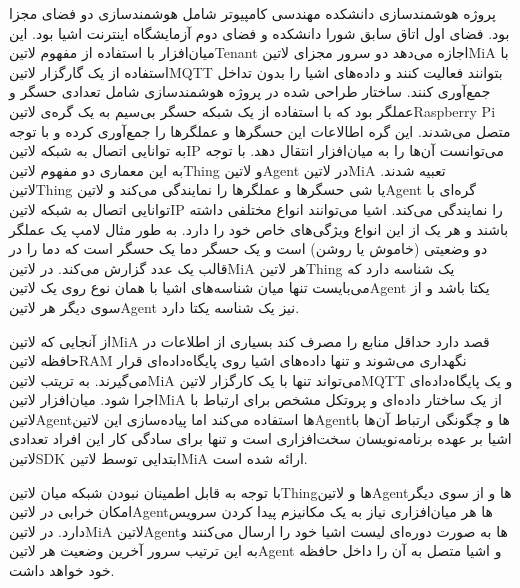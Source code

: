 \documentclass[]{assignment}
\begin{document}
پروژه هوشمند‌سازی دانشکده مهندسی کامپیوتر شامل هوشمند‌سازی دو فضای مجزا بود. فضای اول اتاق سابق شورا دانشکده و فضای دوم آزمایشگاه اینترنت اشیا بود.
این میان‌افزار با استفاده از مفهوم ‌لاتین{Tenant} اجازه می‌دهد دو سرور مجزای ‌لاتین{MiA} با استفاده از یک گارگزار ‌لاتین{MQTT}
بتوانند فعالیت کنند و داده‌های اشیا را بدون تداخل جمع‌آوری کنند.
ساختار طراحی شده در پروژه هوشمند‌سازی شامل تعدادی حسگر و عملگر بود که با استفاده از یک شبکه حسگر بی‌سیم به یک گره‌ی ‌لاتین{Raspberry Pi}
متصل می‌شدند. این گره اطالاعات این حسگرها و عملگرها را جمع‌آوری کرده و با توجه به توانایی اتصال به شبکه ‌لاتین{IP} می‌توانست آن‌ها را به میان‌افزار انتقال دهد.
با توجه به این معماری دو مفهوم ‌لاتین{Thing} و ‌لاتین{Agent} در ‌لاتین{MiA} تعبیه شدند. ‌لاتین{Thing} یا شی حسگرها و عملگرها را نمایندگی می‌کند
و ‌لاتین{Agent} گره‌ای با توانایی اتصال به شبکه ‌لاتین{IP} را نمایندگی می‌کند.
اشیا می‌توانند انواع مختلفی داشته باشند و هر یک از این انواع ویژگی‌های خاص خود را دارد. به طور مثال لامپ یک عملگر دو وضعیتی (خاموش یا روشن)
است و یک حسگر دما یک حسگر است که دما را در قالب یک عدد گزارش می‌کند.
در ‌لاتین{MiA} هر ‌لاتین{Thing} یک شناسه دارد که می‌بایست تنها میان شناسه‌های اشیا با همان نوع روی یک ‌لاتین{Agent} یکتا باشد و از سوی دیگر هر ‌لاتین{Agent} نیز یک شناسه
یکتا دارد.

از آنجایی که ‌لاتین{MiA} قصد دارد حداقل منابع را مصرف کند بسیاری از اطلاعات در حافظه ‌لاتین{RAM} نگهداری می‌شوند و تنها داده‌های اشیا روی پایگاه‌داده‌ای قرار می‌گیرند.
به تریتب ‌لاتین{MiA} می‌تواند تنها با یک کارگزار ‌لاتین{MQTT} و یک پایگاه‌داده‌ای اجرا شود.
میان‌افزار ‌لاتین{MiA} از یک ساختار داده‌ای و پروتکل مشخص برای ارتباط با ‌لاتین{Agent}ها استفاده می‌کند اما پیاده‌سازی این ‌لاتین{Agent}ها و چگونگی ارتباط آن‌ها با
اشیا بر عهده برنامه‌نویسان سخت‌افزاری است و تنها برای سادگی کار این افراد تعدادی ‌لاتین{SDK} ابتدایی توسط ‌لاتین{MiA} ارائه شده است.

با توجه به قابل اطمینان نبودن شبکه میان ‌لاتین{Thing}ها و ‌لاتین{Agent}ها و از سوی دیگر امکان خرابی در ‌لاتین{Agent}ها هر میان‌افزاری نیاز به یک مکانیزم پیدا کردن سرویس
دارد. در ‌لاتین{MiA} ‌لاتین{Agent}ها به صورت دوره‌ای لیست اشیا خود را ارسال می‌کنند و به این ترتیب سرور آخرین وضعیت هر ‌لاتین{Agent} و اشیا متصل به آن را داخل حافظه خود خواهد داشت.


 
 
\end{document}
